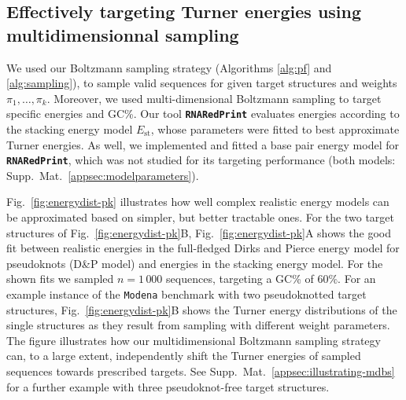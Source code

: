 \documentclass[]{bmcart}
\newcommand{\Nuc}[1]{{\sf #1}}
\newcommand{\Cb}{\Nuc{C}}
\newcommand{\Gb}{\Nuc{G}}
\newcommand{\GCb}{\Gb\Cb}
\newcommand{\ourprog}{{\tt \bfseries{}\color{black!85}RNA\textcolor{red!70!black}{Red}Print}}
\newcommand{\EnergyStacking}{E_{\text{st}}}
\newcommand{\revised}[1]{{\color{red} #1}}
\begin{document}
\subsection*{Effectively targeting Turner energies using multidimensionnal sampling}
\revised{


We used our Boltzmann sampling strategy (Algorithms
\ref{alg:pf} and \ref{alg:sampling}), to sample valid sequences for
given target structures and weights $\pi_1,\dots,\pi_k$.  Moreover, we
used multi-dimensional Boltzmann sampling to target specific energies and
\GCb\%.  Our tool \ourprog{} evaluates energies according to the
stacking energy model $\EnergyStacking$, whose parameters were fitted
to best approximate Turner energies. As well, we implemented and
fitted a base pair energy model for \ourprog{}, which was not studied
for its targeting performance (both models:
Supp.\ Mat.~\ref{appsec:modelparameters}).
%
%


Fig.~\ref{fig:energydist-pk} illustrates how well complex realistic energy models can be approximated based on simpler, but better tractable ones. For
the two target structures of Fig.~\ref{fig:energydist-pk}B,
Fig.~\ref{fig:energydist-pk}A shows the good fit between realistic
energies in the full-fledged Dirks and Pierce energy model for
pseudoknots (D\&P model) and energies in the stacking energy
model. For the shown fits we sampled $n=1\,000$ sequences, targeting a
\GCb\% of $60\%$.
%
For an example instance of the \texttt{Modena} benchmark with two
pseudoknotted target structures, Fig.~\ref{fig:energydist-pk}B shows
the Turner energy distributions of the single structures as they
result from sampling with different weight parameters. The figure
illustrates how our multidimensional Boltzmann sampling strategy can,
to a large extent, independently shift the Turner energies of sampled
sequences towards prescribed targets. See Supp.\ Mat.~\ref{appsec:illustrating-mdbs} for a further example with three
pseudoknot-free target structures.}
\end{document}
